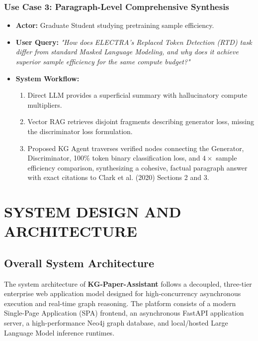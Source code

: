 \documentclass[12pt,a4paper,oneside]{report}
\begin{document}
\subsection{Use Case 3: Paragraph-Level Comprehensive Synthesis}
\begin{itemize}
    \item \textbf{Actor:} Graduate Student studying pretraining sample efficiency.
    \item \textbf{User Query:} \textit{"How does ELECTRA's Replaced Token Detection (RTD) task differ from standard Masked Language Modeling, and why does it achieve superior sample efficiency for the same compute budget?"}
    \item \textbf{System Workflow:}
    \begin{enumerate}
        \item Direct LLM provides a superficial summary with hallucinatory compute multipliers.
        \item Vector RAG retrieves disjoint fragments describing generator loss, missing the discriminator loss formulation.
        \item Proposed KG Agent traverses verified nodes connecting the Generator, Discriminator, 100\% token binary classification loss, and $4\times$ sample efficiency comparison, synthesizing a cohesive, factual paragraph answer with exact citations to Clark et al. (2020) Sections 2 and 3.
    \end{enumerate}
\end{itemize}




\chapter{SYSTEM DESIGN AND ARCHITECTURE}

\section{Overall System Architecture}
The system architecture of \textbf{KG-Paper-Assistant} follows a decoupled, three-tier enterprise web application model designed for high-concurrency asynchronous execution and real-time graph reasoning. The platform consists of a modern Single-Page Application (SPA) frontend, an asynchronous FastAPI application server, a high-performance Neo4j graph database, and local/hosted Large Language Model inference runtimes.
\end{document}
